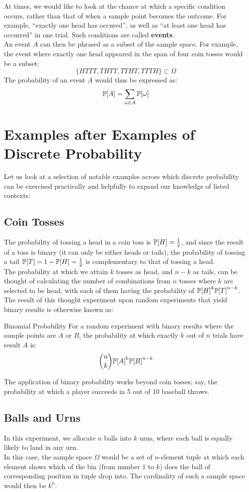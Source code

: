 At times, we would like to look at the chance at which a specific condition occurs, rather than that of when a sample point becomes the outcome. For example, ``exactly one head has occured'', as well as ``at least one head has occurred'' in one trial. Such conditions are called \textbf{events}. \\
An event $A$ can then be phrased as a subset of the sample space. For example, the event where exactly one head appeared in the span of four coin tosses would be a subset:
\[\{HTTT, THTT, TTHT, TTTH\} \subset \Omega\]
The probability of an event $A$ would thus be expressed as:
\[\P[A] = \sum_{\omega \in A} \P[\omega]\]

\section{Examples after Examples of Discrete Probability}
Let us look at a selection of notable examples across which discrete probability can be exercised practically and helpfully to expand our knowledge of listed contexts:

\subsection{Coin Tosses}
The probability of tossing a head in a coin toss is $\P[H] = \frac{1}{2}$, and since the result of a toss is binary (it can only be either heads or tails), the probability of tossing a tail $\P[T] = 1 - \P[H] = \frac{1}{2}$ is complementary to that of tossing a head. \\
The probability at which we attain $k$ tosses as head, and $n - k$ as tails, can be thought of calculating the number of combinations from $n$ tosses where $k$ are selected to be head, with each of them having the probability of ${\P[H]}^k {\P[T]}^{n - k}$. \\
The result of this thought experiment upon random experiments that yield binary results is otherwise known as:
\begin{ln-define}{Binomial Probability}{}
    For a random experiment with binary results where the sample points are $A$ or $B$, the probability at which exactly $k$ out of $n$ trials have result $A$ is:
    \[\binom{n}{k} {\P[A]}^k {\P[B]}^{n - k}\]
\end{ln-define}
The application of binary probability works beyond coin tosses; say, the probability at which a player succeeds in 5 out of 10 baseball throws.

\subsection{Balls and Urns}
In this experiment, we allocate $n$ balls into $k$ urns, where each ball is equally likely to land in any urn. \\
In this case, the sample space $\Omega$ would be a set of $n$-element tuple at which each element shows which of the bin (from number $1$ to $k$) does the ball of corresponding position in tuple drop into. The cardinality of such a sample space would then be ${k}^{n}$. \\

